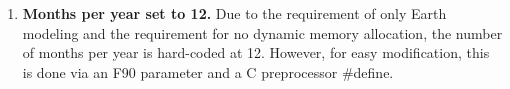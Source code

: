 
\begin{enumerate}

\item {\bf Months per year set to 12.} Due to the requirement of only Earth 
modeling and the requirement for no
dynamic memory allocation, the number of months per year is hard-coded
at 12.  However, for easy modification, this is done via an F90 parameter 
and a C preprocessor \#define.

\end{enumerate}
